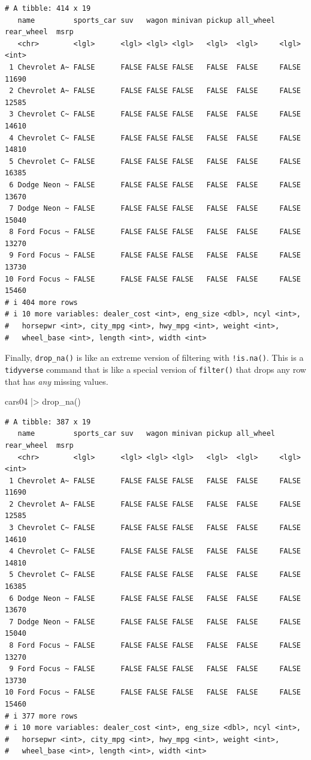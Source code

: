 \documentclass[
  letterpaper,
]{book}
\newenvironment{Shaded}{\begin{snugshade}}{\end{snugshade}}
\newcommand{\FunctionTok}[1]{\textcolor[rgb]{0.28,0.35,0.67}{#1}}
\newcommand{\NormalTok}[1]{\textcolor[rgb]{0.00,0.23,0.31}{#1}}
\newcommand{\SpecialCharTok}[1]{\textcolor[rgb]{0.37,0.37,0.37}{#1}}
\begin{document}
\begin{verbatim}
# A tibble: 414 x 19
   name         sports_car suv   wagon minivan pickup all_wheel rear_wheel  msrp
   <chr>        <lgl>      <lgl> <lgl> <lgl>   <lgl>  <lgl>     <lgl>      <int>
 1 Chevrolet A~ FALSE      FALSE FALSE FALSE   FALSE  FALSE     FALSE      11690
 2 Chevrolet A~ FALSE      FALSE FALSE FALSE   FALSE  FALSE     FALSE      12585
 3 Chevrolet C~ FALSE      FALSE FALSE FALSE   FALSE  FALSE     FALSE      14610
 4 Chevrolet C~ FALSE      FALSE FALSE FALSE   FALSE  FALSE     FALSE      14810
 5 Chevrolet C~ FALSE      FALSE FALSE FALSE   FALSE  FALSE     FALSE      16385
 6 Dodge Neon ~ FALSE      FALSE FALSE FALSE   FALSE  FALSE     FALSE      13670
 7 Dodge Neon ~ FALSE      FALSE FALSE FALSE   FALSE  FALSE     FALSE      15040
 8 Ford Focus ~ FALSE      FALSE FALSE FALSE   FALSE  FALSE     FALSE      13270
 9 Ford Focus ~ FALSE      FALSE FALSE FALSE   FALSE  FALSE     FALSE      13730
10 Ford Focus ~ FALSE      FALSE FALSE FALSE   FALSE  FALSE     FALSE      15460
# i 404 more rows
# i 10 more variables: dealer_cost <int>, eng_size <dbl>, ncyl <int>,
#   horsepwr <int>, city_mpg <int>, hwy_mpg <int>, weight <int>,
#   wheel_base <int>, length <int>, width <int>
\end{verbatim}

Finally, \texttt{drop\_na()} is like an extreme version of filtering
with \texttt{!is.na()}. This is a \texttt{tidyverse} command that is
like a special version of \texttt{filter()} that drops any row that has
\emph{any} missing values.

\begin{Shaded}
\begin{Highlighting}[]
\NormalTok{cars04 }\SpecialCharTok{|\textgreater{}} 
  \FunctionTok{drop\_na}\NormalTok{()}
\end{Highlighting}
\end{Shaded}

\begin{verbatim}
# A tibble: 387 x 19
   name         sports_car suv   wagon minivan pickup all_wheel rear_wheel  msrp
   <chr>        <lgl>      <lgl> <lgl> <lgl>   <lgl>  <lgl>     <lgl>      <int>
 1 Chevrolet A~ FALSE      FALSE FALSE FALSE   FALSE  FALSE     FALSE      11690
 2 Chevrolet A~ FALSE      FALSE FALSE FALSE   FALSE  FALSE     FALSE      12585
 3 Chevrolet C~ FALSE      FALSE FALSE FALSE   FALSE  FALSE     FALSE      14610
 4 Chevrolet C~ FALSE      FALSE FALSE FALSE   FALSE  FALSE     FALSE      14810
 5 Chevrolet C~ FALSE      FALSE FALSE FALSE   FALSE  FALSE     FALSE      16385
 6 Dodge Neon ~ FALSE      FALSE FALSE FALSE   FALSE  FALSE     FALSE      13670
 7 Dodge Neon ~ FALSE      FALSE FALSE FALSE   FALSE  FALSE     FALSE      15040
 8 Ford Focus ~ FALSE      FALSE FALSE FALSE   FALSE  FALSE     FALSE      13270
 9 Ford Focus ~ FALSE      FALSE FALSE FALSE   FALSE  FALSE     FALSE      13730
10 Ford Focus ~ FALSE      FALSE FALSE FALSE   FALSE  FALSE     FALSE      15460
# i 377 more rows
# i 10 more variables: dealer_cost <int>, eng_size <dbl>, ncyl <int>,
#   horsepwr <int>, city_mpg <int>, hwy_mpg <int>, weight <int>,
#   wheel_base <int>, length <int>, width <int>
\end{verbatim}
\end{document}
